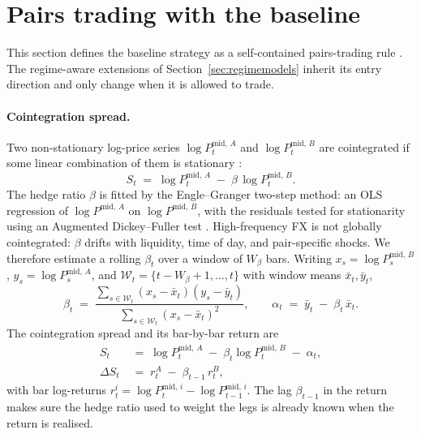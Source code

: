 
\section{Pairs trading with the baseline}\label{sec:pairsbaseline}

This section defines the baseline strategy as a self-contained pairs-trading rule \parencite{gatev2006pairs}. The regime-aware extensions of Section~\ref{sec:regimemodels} inherit its entry direction and only change when it is allowed to trade.

\paragraph{Cointegration spread.}\label{sec:spread}
Two non-stationary log-price series $\log P_t^{\mathrm{mid},\,A}$ and $\log P_t^{\mathrm{mid},\,B}$ are cointegrated if some linear combination of them is stationary \parencite{engle1987cointegration}:
\begin{equation}\label{eq:spreaddef}
    S_t \;=\; \log P_t^{\mathrm{mid},\,A} \;-\; \beta\,\log P_t^{\mathrm{mid},\,B}.
\end{equation}
The hedge ratio $\beta$ is fitted by the Engle--Granger two-step method: an OLS regression of $\log P^{\mathrm{mid},\,A}$ on $\log P^{\mathrm{mid},\,B}$, with the residuals tested for stationarity using an Augmented Dickey--Fuller test \parencite{dickey1979distribution}. High-frequency FX is not globally cointegrated: $\beta$ drifts with liquidity, time of day, and pair-specific shocks. We therefore estimate a rolling $\beta_t$ over a window of $W_\beta$ bars. Writing $x_s = \log P_s^{\mathrm{mid},\,B}$, $y_s = \log P_s^{\mathrm{mid},\,A}$, and $\mathcal{W}_t = \{t-W_\beta+1,\ldots,t\}$ with window means $\bar x_t, \bar y_t$,
\begin{equation}\label{eq:rollingbeta}
    \beta_t \;=\; \frac{\sum_{s \in \mathcal{W}_t}(x_s - \bar x_t)(y_s - \bar y_t)}{\sum_{s \in \mathcal{W}_t}(x_s - \bar x_t)^{2}},
    \qquad
    \alpha_t \;=\; \bar y_t \;-\; \beta_t\, \bar x_t.
\end{equation}
The cointegration spread and its bar-by-bar return are
\begin{equation}\label{eq:rollingspreadret}
\begin{aligned}
    S_t \;&=\; \log P_t^{\mathrm{mid},\,A} \;-\; \beta_t \log P_t^{\mathrm{mid},\,B} \;-\; \alpha_t,\\[2pt]
    \Delta S_t \;&=\; r_t^{A} \;-\; \beta_{t-1}\, r_t^{B},
\end{aligned}
\end{equation}
with bar log-returns $r_t^{i} = \log P_t^{\mathrm{mid},\,i} - \log P_{t-1}^{\mathrm{mid},\,i}$. The lag $\beta_{t-1}$ in the return makes sure the hedge ratio used to weight the legs is already known when the return is realised.

